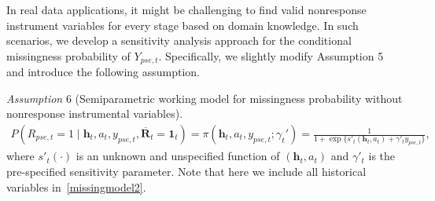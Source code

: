 \documentclass[12pt]{article}
\begin{document}
In real data applications, it might be challenging to find valid nonresponse instrument variables for every stage based on domain knowledge. 
In such scenarios, we develop a sensitivity analysis approach 
for the conditional missingness probability of $Y_{pse,t}$. 
Specifically, we slightly modify Assumption 5 and introduce the following assumption.
\begin{description}
    \item {\em Assumption} 6 (Semiparametric working model for missingness probability  without nonresponse instrumental variables).
    \begin{align} \label{missingmodel2}
        P(R_{pse,t}=1\mid \bm{h}_t, a_t, y_{pse,t},\overline{\bm{R}}_t = \bm{1}_t) =\pi(\bm{h}_t,a_t,y_{pse,t};\gamma_t')= \frac{1}{1+\exp\{s'_t(\bm{h}_t,a_t)+\gamma'_t y_{pse,t}\}},
    \end{align}
    where $s'_t(\cdot)$ is an unknown and unspecified function of $(\bm{h}_t,a_t)$ and $\gamma'_t$ is  the pre-specified sensitivity parameter. Note that here we include all historical variables in~\eqref{missingmodel2}. %
\end{description}

\end{document}
